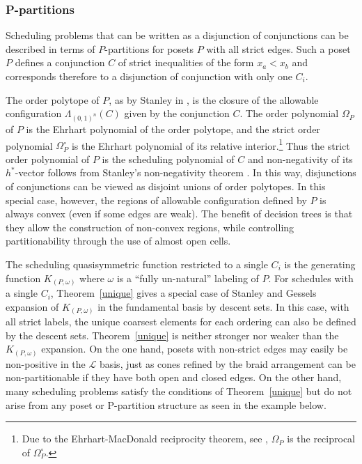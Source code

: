\documentclass[12pt,reqno]{amsart}
\numberwithin{definition}{section}
\theoremstyle{definition}
\newcommand{\ncL}{\mathcal{L}}
\newcommand{\allow}{\Lambda} %
\newcommand{\allowC}{\allow_{(0,1)^n}} %
\begin{document}
\subsubsection{P-partitions} 

Scheduling problems that can be written as a disjunction of conjunctions  can be
described in terms of $P$-partitions for posets $P$ with all strict
edges.  Such a poset $P$ defines a conjunction $C$ of strict inequalities of the form $x_a<x_b$ and corresponds therefore to a disjunction of conjunction with only one $C_i$.

The order polytope of $P$, as by Stanley in \cite{StanleyOrderPolytopes}, is the closure of the allowable configuration $\allowC(C)$ given by the conjunction $C$. The order polynomial $\Omega_P$ of $P$ is the Ehrhart polynomial of the order polytope, and the strict order polynomial $\Omega^\circ_P$ is the Ehrhart polynomial of its relative interior.\footnote{Due to the Ehrhart-MacDonald reciprocity theorem, see \cite[Chapter~4]{Beck2007}, $\Omega_P$ is the reciprocal of $\Omega^\circ_P$.}  Thus the strict order polynomial of $P$ is the scheduling polynomial of $C$ and non-negativity of its $h^*$-vector follows from Stanley's non-negativity theorem \cite{StanleyDecomp}. In this way, disjunctions of conjunctions can be viewed as disjoint unions of order polytopes. In this special case, however, the regions of allowable configuration defined by $P$ is always convex (even if some edges are weak). The benefit of decision trees is that they allow the construction of non-convex regions, while controlling partitionability through the use of almost open cells.

The scheduling quasisymmetric function
 restricted to a single $C_{i}$ is the generating function
$K_{(P,\omega)}$ where $\omega$ is a ``fully un-natural'' labeling of
$P$. For schedules with a single $C_{i}$, Theorem~\ref{unique}
gives a special case of Stanley and Gessels~\cite{Gessel,StanP} 
expansion of $K_{(P,\omega)}$ in the fundamental basis by descent
sets.  In this case, with all strict labels, the unique coarsest
elements for each ordering can also be defined by the descent sets.
Theorem~\ref{unique} is neither  stronger nor weaker than the
$K_{(P,\omega)}$ expansion.  
On the one hand, posets with non-strict edges may easily be non-positive in the $\ncL$ basis, just as cones refined by the braid arrangement can be non-partitionable if they have both open and closed edges. 
On the other hand, many scheduling problems satisfy the conditions of Theorem~\ref{unique} but do not arise from any poset or P-partition structure as seen in the example below.
\end{document}
